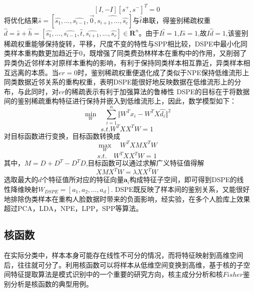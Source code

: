 $$[I,-I][s^{+},s^{-}]^{T}=0$$
将优化结果$\hat{s}=[\hat{s_{1}},\ldots,\hat{s_{i-1}},\vec{0},\hat{s_{i+1},\ldots,\hat{s_{c}}}]$与$\hat{t}$串联，得鉴别稀疏权重$\hat{d}=\hat{s}+\hat{h}=[\hat{s_{1}},\ldots,\hat{s_{i-1}},\hat{t},\hat{s_{i+1}},\ldots,\hat{s_{c}}]\in \mathbf{R}^{n}$。由于$I\hat{t}=1$,$I\hat{s}=1$,故$I\hat{d}=1$,该鉴别稀疏权重能够保持旋转，平移，尺度不变的特性\cite{马小虎2014基于鉴别稀疏保持嵌入的人脸识别算法}与SPP相比较，DSPE中最小化同类样本重构数更加趋近于0，既增强了同类费劲林样本在重构中的作用，又削弱了异类伪近邻样本对原样本重构的影响，有利于保持同类样本相互靠近，异类样本相互远离的本质。当$er=0$时，鉴别稀疏权重便退化成了类似于NPE保持低维流形上同类数据近邻关系的重构权重，表明DSPE能很好地反映数据在低维流形上的分布，与此同时，对$er$的稀疏表示有利于加强算法的鲁棒性
DSPE的目标在于将数据间的鉴别稀疏重构特征进行保持并嵌入到低维流形上，因此，数学模型如下：
$$\min_{W}\quad\sum_{i=1}^{n}\Vert{W^{T}x_{i}-W^{T}X\hat{d_{i}}}\Vert^{2}$$
$$s.t. W^{T}XX^{T}W=1$$
对目标函数进行变换，目标函数转换成
$$\max_{W}\quad W^{T}XMX^{T}W$$
$$s.t.\quad W^{T}XX^{T}W=1$$
其中，$M=D+D^{T}-D^{T}D$,目标函数可以通过求解广义特征值得解
$$XMX^{T}W=\lambda XX^{T}W$$
选取最大的$d$个特征值所对应的特征向量$\mathbf{a}_{i}$构成特征子空间，即可得到DSPE的线性降维映射$W_{DSPE}=[a_{1},a_{2},\ldots,a_{d}].$
DSPE既反映了样本间的鉴别关系，又能很好地排除伪类样本在重构人脸数据时带来的负面影响，经实验，在多个人脸库上效果超过PCA，LDA，NPE，LPP，SPP等算法。

\subsection{核函数}
在实际分类中，样本本身可能存在线性不可分的情况，而将特征映射到高维空间后，往往就可分了。利用核函数可以将样本从低维空间变换到高维，基于核的子空间特征提取算法是模式识别中的一个重要的研究方向，核主成分分析\cite{scholkopf1998nonlinear}和核$Fisher$鉴别分析\cite{roth1999nonlinear}是核函数的典型用例。
